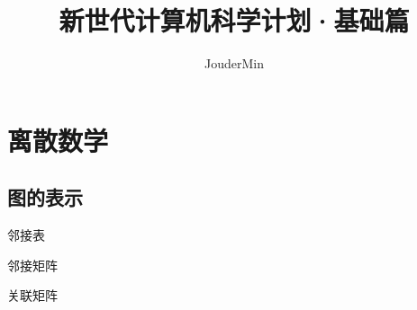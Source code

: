 \documentclass[lang=cn, thmcnt=section, chinesefont=founder, color=cyan, citestyle=gb7714-2015, bibstyle=gb7714-2015]{elegantbook}
\title{新世代计算机科学计划·基础篇}
\author{JouderMin}
\institute{「新世代计算机科学计划」制作委员会}
\date{\zhtoday}
\begin{document}
\maketitle
\frontmatter

\tableofcontents

\mainmatter

\chapter{离散数学}




\section{图的表示}
\begin{introduction}
    \item 邻接表
    \item 邻接矩阵
    \item 关联矩阵
\end{introduction}
\end{document}
